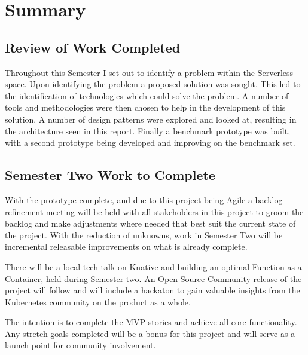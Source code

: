 \section{Summary}

\subsection{Review of Work Completed}
Throughout this Semester I set out to identify a problem within the \gls{Serverless} space. Upon identifying the problem a proposed solution was sought. This led to the identification of technologies which could solve the problem. A number of tools and methodologies were then chosen to help in the development of this solution. A number of design patterns were explored and looked at, resulting in the architecture seen in this report. Finally a benchmark prototype was built, with a second prototype being developed and improving on the benchmark set.
\subsection{Semester Two Work to Complete}
\label{sub:sem2}
With the prototype complete, and due to this project being Agile a backlog refinement meeting will be held with all stakeholders in this project to groom the backlog and make adjustments where needed that best suit the current state of the project. With the reduction of unknowns, work in Semester Two will be incremental releasable improvements on what is already complete.

There will be a local tech talk on Knative and building an optimal Function as a Container, held during Semester two. An Open Source Community release of the project will follow and will include a hackaton to gain valuable insights from the Kubernetes community on the product as a whole.

The intention is to complete the MVP stories and achieve all core functionality. Any stretch goals completed will be a bonus for this project and will serve as a launch point for community involvement.

